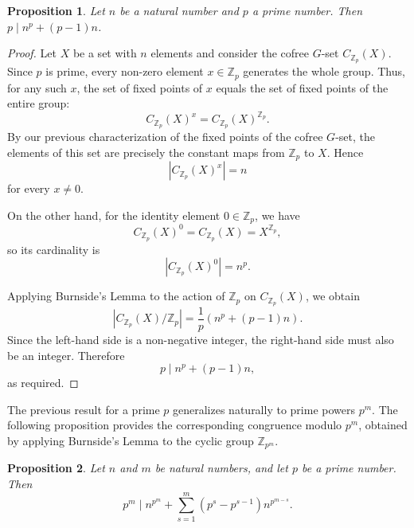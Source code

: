 \documentclass[10pt,a4paper]{amsart}
\newtheorem{proposition}{Proposition}
\begin{document}
\begin{proposition}\label{prop:fermat_prime}
Let $n$ be a natural number and $p$ a prime number. Then $p \mid n^p + (p-1)n$.
\end{proposition}

\begin{proof}
Let $X$ be a set with $n$ elements and consider the cofree $G$-set $C_{\mathbb{Z}_p}(X)$. 
Since $p$ is prime, every non-zero element $x \in \mathbb{Z}_p$ generates the whole group. 
Thus, for any such $x$, the set of fixed points of $x$ equals the set of fixed points of the entire group:
\[
C_{\mathbb{Z}_p}(X)^x = C_{\mathbb{Z}_p}(X)^{\mathbb{Z}_p}.
\]
By our previous characterization of the fixed points of the cofree $G$-set, the elements of this set are precisely the constant maps from $\mathbb{Z}_p$ to $X$. Hence 
\[
\left\lvert C_{\mathbb{Z}_p}(X)^x \right\rvert = n
\]
for every $x \neq 0$.

On the other hand, for the identity element $0 \in \mathbb{Z}_p$, we have
\[
C_{\mathbb{Z}_p}(X)^0 = C_{\mathbb{Z}_p}(X) = X^{\mathbb{Z}_p},
\]
so its cardinality is
\[
\left\lvert C_{\mathbb{Z}_p}(X)^0 \right\rvert = n^p.
\]

Applying Burnside's Lemma to the action of $\mathbb{Z}_p$ on $C_{\mathbb{Z}_p}(X)$, we obtain
\[
\left\lvert C_{\mathbb{Z}_p}(X)/\mathbb{Z}_p \right\rvert
= \frac{1}{p} \left( n^p + (p-1)n \right).
\]
Since the left-hand side is a non-negative integer, the right-hand side must also be an integer. Therefore
\[
p \mid n^p + (p-1)n,
\]
as required.
\end{proof}

The previous result for a prime $p$ generalizes naturally to prime powers $p^m$. The following proposition provides the corresponding congruence modulo $p^m$, obtained by applying Burnside's Lemma to the cyclic group $\mathbb{Z}_{p^m}$.

\begin{proposition}\label{prop:fermat_prime_power}
Let $n$ and $m$ be natural numbers, and let $p$ be a prime number. Then
\[
p^m \mid n^{p^m} + \sum_{s=1}^m (p^s - p^{s-1}) n^{p^{m-s}}.
\]
\end{proposition}
\end{document}
